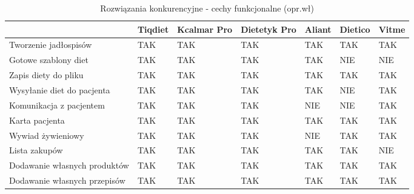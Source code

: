 \begin{minipage}{\textwidth}
    \begin{table}[H]
        \centering\caption{Rozwiązania konkurencyjne - cechy funkcjonalne (opr.wł)\label{tabela:rozwiazania-konkurencyjne-funkcjonalne}}
        \begin{tabular}{|P{.22\textwidth}|P{.09\textwidth}|P{.09\textwidth}|P{.09\textwidth}|P{.09\textwidth}|P{.09\textwidth}|P{.09\textwidth}|}
            \hline
                                                & Tiqdiet   & Kcalmar Pro   & Dietetyk Pro & Aliant         & Dietico   & Vitme   \\ \hline
            Tworzenie jadłospisów               & TAK       & TAK           & TAK          & TAK            & TAK       & TAK     \\ \hline
            Gotowe szablony diet                & TAK       & TAK           & TAK          & TAK            & NIE       & NIE     \\ \hline
            Zapis diety do pliku                & TAK       & TAK           & TAK          & TAK            & TAK       & TAK     \\ \hline
            Wysyłanie diet do pacjenta          & TAK       & TAK           & TAK          & TAK            & NIE       & TAK     \\ \hline
            Komunikacja z pacjentem             & TAK       & TAK           & TAK          & NIE            & NIE       & TAK     \\ \hline
            Karta pacjenta                      & TAK       & TAK           & TAK          & TAK            & TAK       & TAK     \\ \hline
            Wywiad żywieniowy                   & TAK       & TAK           & TAK          & NIE            & TAK       & TAK     \\ \hline
            Lista zakupów                       & TAK       & TAK           & TAK          & TAK            & TAK       & NIE     \\ \hline
            Dodawanie własnych produktów        & TAK       & TAK           & TAK          & TAK            & TAK       & TAK     \\ \hline
            Dodawanie własnych przepisów        & TAK       & TAK           & TAK          & TAK            & TAK       & TAK     \\ \hline
        \end{tabular}
    \end{table}
\end{minipage}

